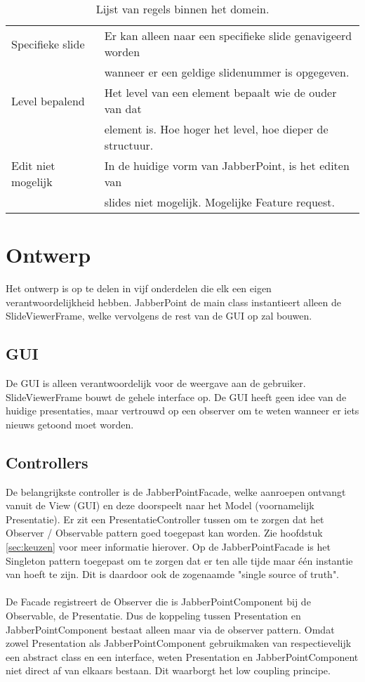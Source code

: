 \documentclass[a4paper]{article}
\newcommand{\1}[0]{\'{e}\'{e}n}
\begin{document}
\begin{table}[!h]
\begin{tabular}{ll}
 	Specifieke slide & Er kan alleen naar een specifieke slide genavigeerd worden \\& wanneer er een geldige slidenummer is opgegeven.\\
 	Level bepalend & Het level van een element bepaalt wie de ouder van dat \\& element is. Hoe hoger het level, hoe dieper de structuur.\\
 	Edit niet mogelijk & In de huidige vorm van JabberPoint, is het editen van \\& slides niet mogelijk. Mogelijke Feature request.\\
  	\bottomrule
	\end{tabular}
\caption{Lijst van regels binnen het domein.}
\label{table:regels}
\end{table}

\section{Ontwerp}
\label{sec:ontwerp}
Het ontwerp is op te delen in vijf onderdelen die elk een eigen
verantwoordelijkheid hebben. JabberPoint de main class instantieert alleen de
SlideViewerFrame, welke vervolgens de rest van de GUI op zal bouwen.

\subsection{GUI}
De GUI is alleen verantwoordelijk voor de weergave aan de gebruiker.
SlideViewerFrame bouwt de gehele interface op. De GUI heeft geen idee van de
huidige presentaties, maar vertrouwd op een observer om te weten wanneer er iets
nieuws getoond moet worden.

\subsection{Controllers}
De belangrijkste controller is de JabberPointFacade, welke aanroepen ontvangt vanuit de View (GUI) en deze doorspeelt naar het Model (voornamelijk Presentatie). Er zit een PresentatieController tussen om te zorgen dat het Observer / Observable pattern goed toegepast kan worden. Zie hoofdstuk \ref{sec:keuzen} voor meer informatie hierover. Op de JabberPointFacade is het Singleton pattern toegepast om te zorgen dat er ten alle tijde maar \1 instantie van hoeft te zijn. Dit is daardoor ook de zogenaamde "single source of truth".
\\\\
De Facade registreert de Observer die is JabberPointComponent bij de Observable, de Presentatie. Dus de koppeling tussen Presentation en JabberPointComponent bestaat alleen maar via de observer pattern. Omdat zowel Presentation als JabberPointComponent gebruikmaken van respectievelijk een abstract class en een interface, weten Presentation en JabberPointComponent niet direct af van elkaars bestaan. Dit waarborgt het low coupling principe.
\end{document}
